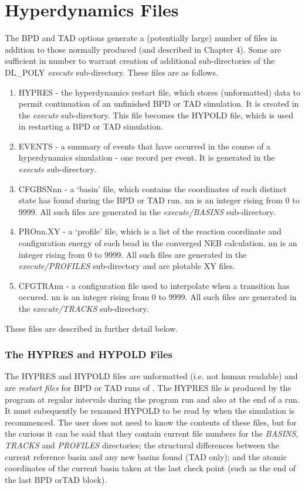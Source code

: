 \section{\D{} Hyperdynamics Files}
\label{hypfiles}

The \D{} BPD and TAD options generate a (potentially large) number of
files in addition to those normally produced (and described in Chapter
4). Some are sufficient in number to warrant creation of additional
sub-directories of the DL\_POLY {\em execute} sub-directory. These
files are as follows.

\begin{enumerate}
\item HYPRES - the hyperdynamics restart file, which stores 
(unformatted) data to permit continuation of an unfinished BPD or TAD
simulation. It is created in the {\em execute} sub-directory. This
file becomes the HYPOLD file, which is used in restarting a BPD or TAD
simulation.
\item EVENTS - a summary of events that have occurred in the
course of a hyperdynamics simulation - one record per event. It is
generated in the {\em execute} sub-directory.
\item CFGBSNnn - a `basin' file, which contains the coordinates of each
distinct state \D{} has found during the BPD or TAD run. nn is an integer
rising from 0 to 9999. All such files are generated in the {\em
execute/BASINS} sub-directory.
\item PROnn.XY - a `profile' file, which is a list of the reaction 
coordinate and configuration energy of each bead in the converged NEB
calculation. nn is an integer rising from 0 to 9999. All such files are
generated in the {\em execute/PROFILES} sub-directory and are plotable
XY files.
\item CFGTRAnn - a configuration file used to interpolate when a
transition has occured. nn is an integer rising from 0 to 9999.
All such files are generated in the {\em execute/TRACKS} sub-directory.
\end{enumerate}
These files are described in further detail below.

\subsubsection{The HYPRES and HYPOLD Files}

The HYPRES and HYPOLD files are unformatted (i.e. not human readable)
and are {\em restart files} for BPD or TAD runs of \D{}. The HYPRES file
is produced by the program at regular intervals during the program run
and also at the end of a run. It must subequently be renamed HYPOLD to
be read by \D{} when the simulation is recommenced. The user does not
need to know the contents of these files, but for the curious it can
be said that they contain current file numbers for the {\em BASINS},
{\em TRACKS} and {\em PROFILES} directories; the structural
differences between the current reference basin and any new basins
found (TAD only); and the atomic coordinates of the current basin
taken at the last check point (such as the end of the last BPD orTAD
block).


